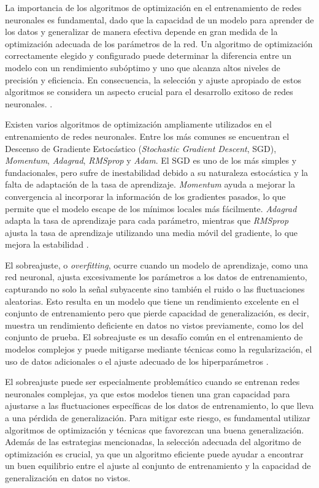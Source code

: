 La importancia de los algoritmos de optimización en el entrenamiento de redes neuronales es fundamental, dado que la capacidad de un modelo para aprender de los datos y generalizar de manera efectiva depende en gran medida de la optimización adecuada de los parámetros de la red. Un algoritmo de optimización correctamente elegido y configurado puede determinar la diferencia entre un modelo con un rendimiento subóptimo y uno que alcanza altos niveles de precisión y eficiencia. En consecuencia, la selección y ajuste apropiado de estos algoritmos se considera un aspecto crucial para el desarrollo exitoso de redes neuronales. \cite{goodfellow2016deep}.

Existen varios algoritmos de optimización ampliamente utilizados en el entrenamiento de redes neuronales. Entre los más comunes se encuentran el Descenso de Gradiente Estocástico (\textit{Stochastic Gradient Descent}, SGD), \textit{Momentum}, \textit{Adagrad}, \textit{RMSprop} y \textit{Adam}. El SGD es uno de los más simples y fundacionales, pero sufre de inestabilidad debido a su naturaleza estocástica y la falta de adaptación de la tasa de aprendizaje. \textit{Momentum} ayuda a mejorar la convergencia al incorporar la información de los gradientes pasados, lo que permite que el modelo escape de los mínimos locales más fácilmente. \textit{Adagrad} adapta la tasa de aprendizaje para cada parámetro, mientras que \textit{RMSprop} ajusta la tasa de aprendizaje utilizando una media móvil del gradiente, lo que mejora la estabilidad \cite{bottou2010large}.

El sobreajuste, o \textit{overfitting}, ocurre cuando un modelo de aprendizaje, como una red neuronal, ajusta excesivamente los parámetros a los datos de entrenamiento, capturando no solo la señal subyacente sino también el ruido o las fluctuaciones aleatorias. Esto resulta en un modelo que tiene un rendimiento excelente en el conjunto de entrenamiento pero que pierde capacidad de generalización, es decir, muestra un rendimiento deficiente en datos no vistos previamente, como los del conjunto de prueba. El sobreajuste es un desafío común en el entrenamiento de modelos complejos y puede mitigarse mediante técnicas como la regularización, el uso de datos adicionales o el ajuste adecuado de los hiperparámetros \cite{bishop2006pattern}.

El sobreajuste puede ser especialmente problemático cuando se entrenan redes neuronales complejas, ya que estos modelos tienen una gran capacidad para ajustarse a las fluctuaciones específicas de los datos de entrenamiento, lo que lleva a una pérdida de generalización. Para mitigar este riesgo, es fundamental utilizar algoritmos de optimización y técnicas que favorezcan una buena generalización. Además de las estrategias mencionadas, la selección adecuada del algoritmo de optimización es crucial, ya que un algoritmo eficiente puede ayudar a encontrar un buen equilibrio entre el ajuste al conjunto de entrenamiento y la capacidad de generalización en datos no vistos.

